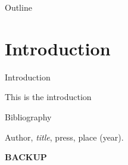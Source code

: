 \documentclass[8pt, xcolor=table]{beamer}
\begin{document}
\parskip=0cm
\justify

\begin{frame}[plain]
  \titlepage
\end{frame}
\parskip=0.2cm

\begin{frame}{Outline}
  \large{
    \parindent=1cm
    \tableofcontents
    \parindent=0cm
  }
\end{frame}


\section{Introduction}\label{Introduction}
\begin{frame}{Introduction}

  This is the introduction
  
\end{frame}


\begin{frame}{Bibliography}
 \begin{thebibliography}{}
  \parskip=3mm
  \bibitem{} Author, {\it title}, press, place (year).
  \end{thebibliography}
\end{frame}

\begin{backupframe}
  \centering
  \vspace{0.1cm}
  \textbf{\Huge{BACKUP}}
\end{backupframe}
\end{document}
